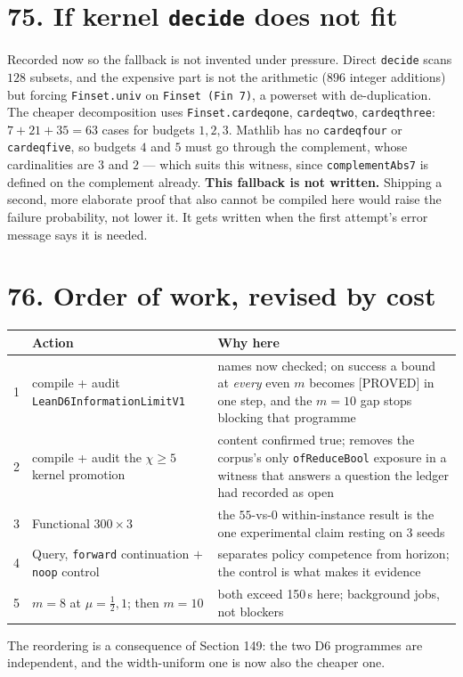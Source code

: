 \documentclass[9pt,twocolumn]{article}
\newcommand{\eclass}[1]{\textsf{[#1]}}
\renewcommand{\_}{\CIGunderscore\allowbreak}
\begin{document}
\section*{75. If kernel \texttt{decide} does not fit}
Recorded now so the fallback is not invented under pressure. Direct \texttt{decide} scans $128$ subsets, and the expensive part is not the arithmetic ($896$ integer additions) but forcing \texttt{Finset.univ} on \texttt{Finset (Fin 7)}, a powerset with de-duplication. The cheaper decomposition uses \texttt{Finset.card\_eq\_one}, \texttt{card\_eq\_two}, \texttt{card\_eq\_three}: $7+21+35=63$ cases for budgets $1,2,3$. Mathlib has no \texttt{card\_eq\_four} or \texttt{card\_eq\_five}, so budgets $4$ and $5$ must go through the complement, whose cardinalities are $3$ and $2$ --- which suits this witness, since \texttt{complementAbs7} is defined on the complement already.
\textbf{This fallback is not written.} Shipping a second, more elaborate proof that also cannot be compiled here would raise the failure probability, not lower it. It gets written when the first attempt's error message says it is needed.

\section*{76. Order of work, revised by cost}
\begin{center}\scriptsize
\begin{tabularx}{0.98\columnwidth}{r X X}
\toprule
& Action & Why here\\
\midrule
1 & compile + audit \texttt{Lean\allowbreak D6\allowbreak Information\allowbreak LimitV1} & names now checked; on success a bound at \emph{every} even $m$ becomes \eclass{PROVED} in one step, and the $m{=}10$ gap stops blocking that programme\\
2 & compile + audit the $\chi\ge5$ kernel promotion & content confirmed true; removes the corpus's only \texttt{ofReduceBool} exposure in a witness that answers a question the ledger had recorded as open\\
3 & Functional $300\times3$ & the $55$-vs-$0$ within-instance result is the one experimental claim resting on $3$ seeds\\
4 & Query, \texttt{forward} continuation $+$ \texttt{noop} control & separates policy competence from horizon; the control is what makes it evidence\\
5 & $m{=}8$ at $\mu=\tfrac12,1$; then $m{=}10$ & both exceed 150\,s here; background jobs, not blockers\\
\bottomrule
\end{tabularx}
\end{center}
The reordering is a consequence of Section 149: the two D6 programmes are independent, and the width-uniform one is now also the cheaper one.
\end{document}

